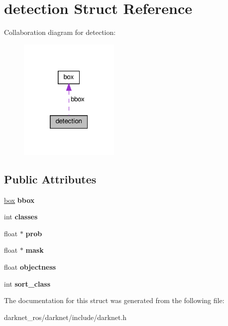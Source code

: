 \hypertarget{structdetection}{}\section{detection Struct Reference}
\label{structdetection}


Collaboration diagram for detection\+:
\nopagebreak
\begin{figure}[H]
\begin{center}
\leavevmode
\includegraphics[width=136pt]{structdetection__coll__graph}
\end{center}
\end{figure}
\subsection*{Public Attributes}
\begin{DoxyCompactItemize}
\item 
\mbox{\label{structdetection_a0e96ec314ffa1b5462b81752d1842191}} 
\hyperlink{structbox}{box} {\bfseries bbox}
\item 
\mbox{\label{structdetection_a5501f226bdc7ce3630666a8065fa70b9}} 
int {\bfseries classes}
\item 
\mbox{\label{structdetection_a135fa8f73988691651cb54335e6e20c2}} 
float $\ast$ {\bfseries prob}
\item 
\mbox{\label{structdetection_a52d75f4c96f7ae42075f4792b1852946}} 
float $\ast$ {\bfseries mask}
\item 
\mbox{\label{structdetection_afd81464803f6cca28d0d3171158f0d52}} 
float {\bfseries objectness}
\item 
\mbox{\label{structdetection_a134b1d6d4fa5b3356af1e4af9d53f344}} 
int {\bfseries sort\+\_\+class}
\end{DoxyCompactItemize}


The documentation for this struct was generated from the following file\+:\begin{DoxyCompactItemize}
\item 
darknet\+\_\+ros/darknet/include/darknet.\+h\end{DoxyCompactItemize}
